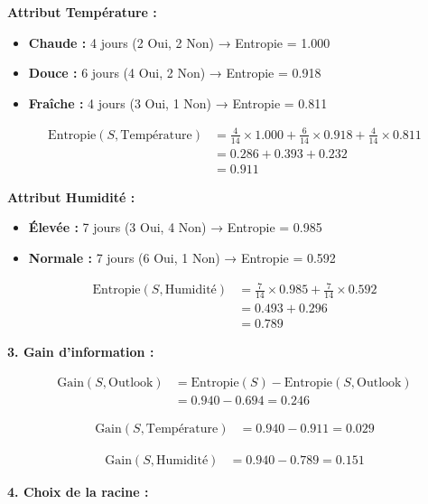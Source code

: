 \documentclass[11pt,a4paper]{article}
\begin{document}
\begin{solutionbox}
\textbf{Attribut Température :}
\begin{itemize}
    \item \textbf{Chaude :} 4 jours (2 Oui, 2 Non) → Entropie = 1.000
    \item \textbf{Douce :} 6 jours (4 Oui, 2 Non) → Entropie = 0.918
    \item \textbf{Fraîche :} 4 jours (3 Oui, 1 Non) → Entropie = 0.811
\end{itemize}

\begin{align*}
\text{Entropie}(S, \text{Température}) &= \frac{4}{14} \times 1.000 + \frac{6}{14} \times 0.918 + \frac{4}{14} \times 0.811 \\
                          &= 0.286 + 0.393 + 0.232 \\
                          &= 0.911
\end{align*}

\textbf{Attribut Humidité :}
\begin{itemize}
    \item \textbf{Élevée :} 7 jours (3 Oui, 4 Non) → Entropie = 0.985
    \item \textbf{Normale :} 7 jours (6 Oui, 1 Non) → Entropie = 0.592
\end{itemize}

\begin{align*}
\text{Entropie}(S, \text{Humidité}) &= \frac{7}{14} \times 0.985 + \frac{7}{14} \times 0.592 \\
                      &= 0.493 + 0.296 \\
                      &= 0.789
\end{align*}

\textbf{3. Gain d'information :}

\begin{align*}
\text{Gain}(S, \text{Outlook}) &= \text{Entropie}(S) - \text{Entropie}(S, \text{Outlook}) \\
                  &= 0.940 - 0.694 = 0.246
\end{align*}

\begin{align*}
\text{Gain}(S, \text{Température}) &= 0.940 - 0.911 = 0.029
\end{align*}

\begin{align*}
\text{Gain}(S, \text{Humidité}) &= 0.940 - 0.789 = 0.151
\end{align*}

\textbf{4. Choix de la racine :}


\end{solutionbox}
\end{document}
